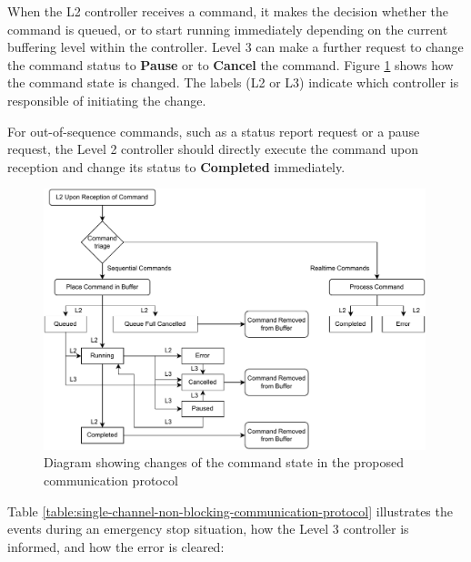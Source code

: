 When the L2 controller receives a command, it makes the decision whether the command is queued, or to start running immediately depending on the current buffering level within the controller. Level 3 can make a further request to change the command status to \textbf{Pause }or to \textbf{Cancel }the command. Figure \ref{fig:state-changes-of-a-command} shows how the command state is changed. The labels (L2 or L3) indicate which controller is responsible of initiating the change. 

For out-of-sequence commands, such as a status report request or a pause request, the Level 2 controller should directly execute the command upon reception and change its status to \textbf{Completed }immediately.

\begin{figure}[!h]
    \centering
    \includegraphics[width=0.99\textwidth]{images/6a/command-buffer.pdf}
    \caption{Diagram showing changes of the command state in the proposed communication protocol}
    \label{fig:state-changes-of-a-command}
\end{figure}


Table \ref{table:single-channel-non-blocking-communication-protocol} illustrates the events during an emergency stop situation, how the Level 3 controller is informed, and how the error is cleared:

